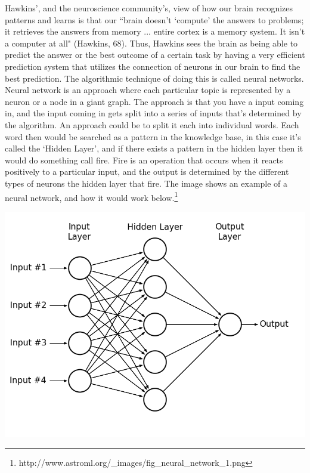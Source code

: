 \documentclass[11pt, oneside]{article}
\begin{document}
\par Hawkins', and the neuroscience community's, view of how our brain recognizes patterns and learns is that our ``brain doesn't `compute' the answers to problems; it retrieves the answers from memory ... entire cortex is a memory system. It isn't a computer at all" (Hawkins, 68). Thus, Hawkins sees the brain as being able to predict the answer or the best outcome of a certain task by having a very efficient prediction system that utilizes the connection of neurons in our brain to find the best prediction. The algorithmic technique of doing this is called neural networks. Neural network is an approach where each particular topic is represented by a neuron or a node in a giant graph. The approach is that you have a input coming in, and the input coming in gets split into a series of inputs that's determined by the algorithm. An approach could be to split it each into individual words. Each word then would be searched as a pattern in the knowledge base, in this case it's called the `Hidden Layer', and if there exists a pattern in the hidden layer then it would do something call fire. Fire is an operation that occurs when it reacts positively to a particular input, and the output is determined by the different types of neurons the hidden layer that fire. The image shows an example of a neural network, and how it would work below.\footnote{http://www.astroml.org/\_images/fig\_neural\_network\_1.png}

\includegraphics[scale=0.5]{fig_neural_network_1.png}
\end{document}
